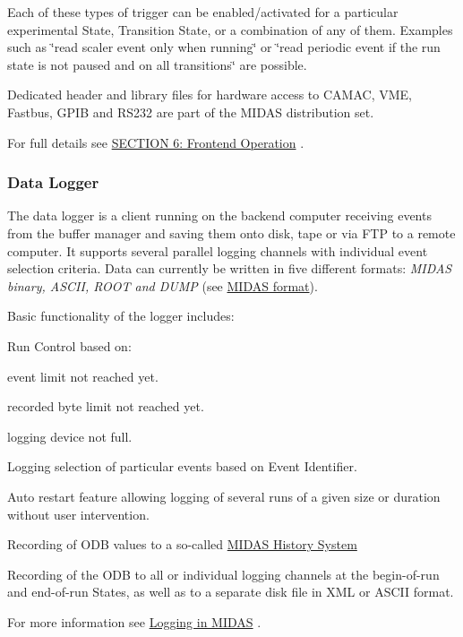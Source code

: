 Each of these types of trigger can be enabled/activated for a particular experimental State, Transition State, or a combination of any of them. Examples such as \char`\"{}read scaler event
only when running\char`\"{} or \char`\"{}read periodic event if the run state is not paused and on all
transitions\char`\"{} are possible.

Dedicated header and library files for hardware access to CAMAC, VME, Fastbus, GPIB and RS232 are part of the MIDAS distribution set. \par
 For full details see \hyperlink{FrontendOperation}{SECTION 6: Frontend Operation} .

\label{F_MainElements_idx_data_logger_overview}
\hypertarget{F_MainElements_idx_data_logger_overview}{}
 \hypertarget{F_MainElements_F_Data_Logger_overview}{}\subsubsection{Data Logger}\label{F_MainElements_F_Data_Logger_overview}
The data logger is a client running on the backend computer receiving events from the buffer manager and saving them onto disk, tape or via FTP to a remote computer. It supports several parallel logging channels with individual event selection criteria. Data can currently be written in five different formats: {\itshape  MIDAS binary, ASCII, ROOT and DUMP \/} (see \hyperlink{FE_Data_format_FE_Midas_format}{MIDAS format}).

Basic functionality of the logger includes:
\begin{DoxyItemize}
\item Run Control based on:
\begin{DoxyItemize}
\item event limit not reached yet.
\item recorded byte limit not reached yet.
\item logging device not full.
\end{DoxyItemize}
\item Logging selection of particular events based on Event Identifier.
\item Auto restart feature allowing logging of several runs of a given size or duration without user intervention.
\item Recording of ODB values to a so-\/called \hyperlink{F_History_logging_F_History_System}{MIDAS History System}
\item Recording of the ODB to all or individual logging channels at the begin-\/of-\/run and end-\/of-\/run States, as well as to a separate disk file in XML or ASCII format. \par
 For more information see \hyperlink{F_Logging}{Logging in MIDAS} .
\end{DoxyItemize}

